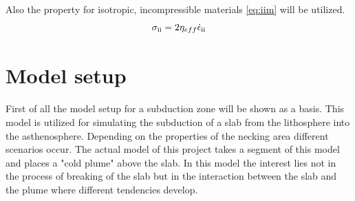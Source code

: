 \documentclass[12pt]{scrartcl}
\newcommand{\RN}[1]{%
  \textup{\uppercase\expandafter{\romannumeral#1}}%
}
\begin{document}
Also the property for isotropic, incompressible materials \ref{eq:iim} will be utilized.
\begin{equation}
\sigma_{\RN{2}} = 2 \eta_{eff}\dot{\epsilon}_{\RN{2}}
\label{eq:iim}
\end{equation}

\section{Model setup}
\label{seq:modelsetup}
First of all the model setup for a subduction zone will be shown as a basis. This model is utilized for simulating the subduction of a slab from the lithosphere into the asthenosphere. Depending on the properties of the necking area different scenarios occur. The actual model of this project takes a segment of this model and places a "cold plume" above the slab. In this model the interest lies not in the process of breaking of the slab but in the interaction between the slab and the plume where different tendencies develop.
\end{document}
